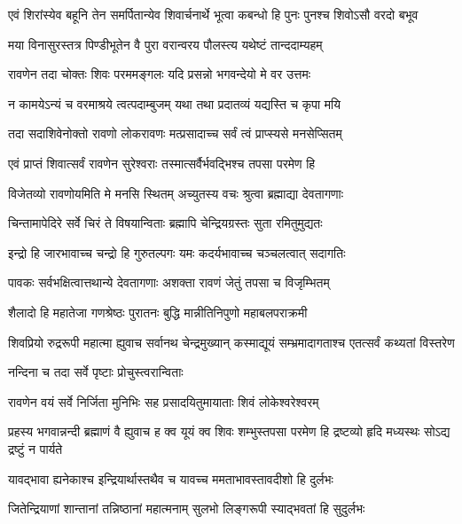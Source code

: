 \twolineshloka
{एवं शिरांस्येव बहूनि तेन समर्पितान्येव शिवार्चनार्थे}
{भूत्वा कबन्धो हि पुनः पुनश्च शिवोऽसौ वरदो बभूव}%

\twolineshloka
{मया विनासुरस्तत्र पिण्डीभूतेन वै पुरा}
{वरान्वरय पौलस्त्य यथेष्टं तान्ददाम्यहम्}%

\twolineshloka
{रावणेन तदा चोक्तः शिवः परममङ्गलः}
{यदि प्रसन्नो भगवन्देयो मे वर उत्तमः}%

\twolineshloka
{न कामयेऽन्यं च वरमाश्रये त्वत्पदाम्बुजम्}
{यथा तथा प्रदातव्यं यद्यस्ति च कृपा मयि}%

\twolineshloka
{तदा सदाशिवेनोक्तो रावणो लोकरावणः}
{मत्प्रसादाच्च सर्वं त्वं प्राप्स्यसे मनसेप्सितम्}%

\twolineshloka
{एवं प्राप्तं शिवात्सर्वं रावणेन सुरेश्वराः}
{तस्मात्सर्वैर्भवद्भिश्च तपसा परमेण हि}%

\twolineshloka
{विजेतव्यो रावणोयमिति मे मनसि स्थितम्}
{अच्युतस्य वचः श्रुत्वा ब्रह्माद्या देवतागणाः}%

\twolineshloka
{चिन्तामापेदिरे सर्वे चिरं ते विषयान्विताः}
{ब्रह्मापि चेन्द्रियग्रस्तः सुता रमितुमुद्यतः}%

\twolineshloka
{इन्द्रो हि जारभावाच्च चन्द्रो हि गुरुतल्पगः}
{यमः कदर्यभावाच्च चञ्चलत्वात् सदागतिः}%

\twolineshloka
{पावकः सर्वभक्षित्वात्तथान्ये देवतागणाः}
{अशक्ता रावणं जेतुं तपसा च विजृम्भितम्}%

\twolineshloka
{शैलादो हि महातेजा गणश्रेष्ठः पुरातनः}
{बुद्धि मान्नीतिनिपुणो महाबलपराक्रमी}%

\twolineshloka
{शिवप्रियो रुद्ररूपी महात्मा ह्युवाच सर्वानथ चेन्द्रमुख्यान्}
{कस्माद्यूयं सम्भ्रमादागताश्च एतत्सर्वं कथ्यतां विस्तरेण}%

\onelineshloka
{नन्दिना च तदा सर्वे पृष्टाः प्रोचुस्त्वरान्विताः}%


\twolineshloka
{रावणेन वयं सर्वे निर्जिता मुनिभिः सह}
{प्रसादयितुमायाताः शिवं लोकेश्वरेश्वरम्}%

\threelineshloka
{प्रहस्य भगवान्नन्दी ब्रह्माणं वै ह्युवाच ह}
{क्व यूयं क्व शिवः शम्भुस्तपसा परमेण हि}
{द्रष्टव्यो हृदि मध्यस्थः सोऽद्य द्रष्टुं न पार्यते}%

\twolineshloka
{यावद्भावा ह्यनेकाश्च इन्द्रियार्थास्तथैव च}
{यावच्च ममताभावस्तावदीशो हि दुर्लभः}%

\twolineshloka
{जितेन्द्रियाणां शान्तानां तन्निष्ठानां महात्मनाम्}
{सुलभो लिङ्गरूपी स्याद्भवतां हि सुदुर्लभः}%

